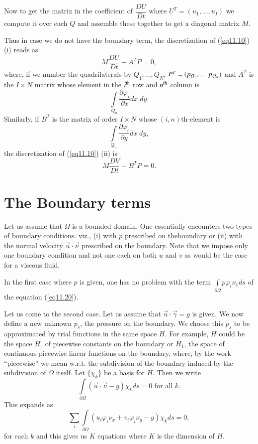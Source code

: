 Now to get the matrix in the coefficient of $\dfrac{DU}{Dt}$ where\break
$U^T =(u_1, \ldots, u_I)$ we compute it over each $Q$ and assemble
these together to get a diagonal matrix $M$. 

Thus in case we do not have the boundary term, the discretization of (\ref{eq11.10}) (i) reads as 
\begin{equation*}
M \frac{DU}{Dt} - A^T P = 0, \tag{11.23}\label{eq11.23}
\end{equation*}
where, if we number the quadrilaterals by $Q_1, \ldots, Q_N$, $P^T =
(p_{Q_1}, \ldots\break p_{Q_N})$ and $A^T$ is the $I\times N$ matrix whose
element in the $i^{\rm th}$ row and $n^{\rm th}$ column is  
$$
\int\limits_{Q_n} \frac{\partial \varphi_i}{\partial x} dx \; dy.
$$
Similarly, if $B^T$ is the matrix of order $I \times N$ whose $(i,n)$th-element is 
$$
\int\limits_{Q_n} \frac{\partial \varphi_i}{\partial y} dx \; dy, 
$$
the discretization of (\ref{eq11.10}) (ii) is 
\begin{equation*}
M \frac{DV}{Dt} - B^T P = 0. \tag{11.24}\label{eq11.24}
\end{equation*}

\section{The Boundary terms}\label{chap11:sec11.5}

Let us assume that $\Omega$ is a bounded domain. One essentially encounters two types of boundary conditions. viz., (i) with $p$ prescribed on the\pageoriginale boundary or (ii) with the normal velocity $\vec{u} \cdot \vec{\nu}$ prescribed on the boundary. Note that we impose only one boundary condition and not one each on both $u$ and $v$ as would be the case for a viscous fluid.

In the first case where $p$ is given, one has no problem with the term
$\int\limits_{\partial \Omega} p \varphi_i \nu_x ds$ of the equation
(\ref{eq11.20}).

Let us come to the second case. Let us assume that $\vec{u} \cdot
\vec{\gamma} = g$ is given. We now define a new unknown $p_{s}$, the
pressure on the boundary. We choose this $p_s$ to be approximated by
trial functions in the same space $H$. For example, $H$ could be the
space $H_\circ$ of piecewise constants on the boundary or $H_1$, the
space of continuous piecewise linear functions on the boundary, where,
by the work ``piecewise'' we mean w.r.t. the subdivision of the
boundary induced by the subdivision of $\Omega$ itself. Let $\{\chi_k
\}$ be a basis for $H$. Then we write 
$$
\int\limits_{\partial \Omega} (\vec{u} \cdot \vec{\nu} - g) \chi_k ds = 0 \text{ for all } k. 
$$
This expands as 
\begin{equation*}
\sum\limits_i \int\limits_{\partial \Omega} (u_i \varphi_i \nu_x + v_i \varphi_i \nu_y -g) \chi_k ds = 0, \tag{11.25}\label{eq11.25}
\end{equation*}
for each $k$ and this gives us  $K$ equations where $K$ is the dimension of $H$.

